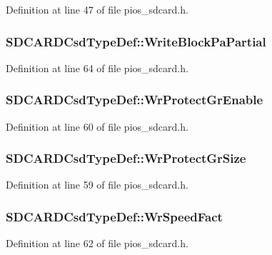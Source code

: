 Definition at line 47 of file pios\-\_\-sdcard.\-h.

\hypertarget{group___p_i_o_s___s_d_c_a_r_d_gaa2d30b075bc701aef9e50397db088180}{
\subsubsection[{Write\-Block\-Pa\-Partial}]{ S\-D\-C\-A\-R\-D\-Csd\-Type\-Def\-::\-Write\-Block\-Pa\-Partial}}\label{group___p_i_o_s___s_d_c_a_r_d_gaa2d30b075bc701aef9e50397db088180}


Definition at line 64 of file pios\-\_\-sdcard.\-h.

\hypertarget{group___p_i_o_s___s_d_c_a_r_d_ga40ddea3e9a913588c57a8f922e929407}{
\subsubsection[{Wr\-Protect\-Gr\-Enable}]{ S\-D\-C\-A\-R\-D\-Csd\-Type\-Def\-::\-Wr\-Protect\-Gr\-Enable}}\label{group___p_i_o_s___s_d_c_a_r_d_ga40ddea3e9a913588c57a8f922e929407}


Definition at line 60 of file pios\-\_\-sdcard.\-h.

\hypertarget{group___p_i_o_s___s_d_c_a_r_d_ga6976b49fb75de7273c9ae54e5b4df865}{
\subsubsection[{Wr\-Protect\-Gr\-Size}]{ S\-D\-C\-A\-R\-D\-Csd\-Type\-Def\-::\-Wr\-Protect\-Gr\-Size}}\label{group___p_i_o_s___s_d_c_a_r_d_ga6976b49fb75de7273c9ae54e5b4df865}


Definition at line 59 of file pios\-\_\-sdcard.\-h.

\hypertarget{group___p_i_o_s___s_d_c_a_r_d_gad518a80289b8949800c8f7e50fc4b21f}{
\subsubsection[{Wr\-Speed\-Fact}]{ S\-D\-C\-A\-R\-D\-Csd\-Type\-Def\-::\-Wr\-Speed\-Fact}}\label{group___p_i_o_s___s_d_c_a_r_d_gad518a80289b8949800c8f7e50fc4b21f}


Definition at line 62 of file pios\-\_\-sdcard.\-h.

